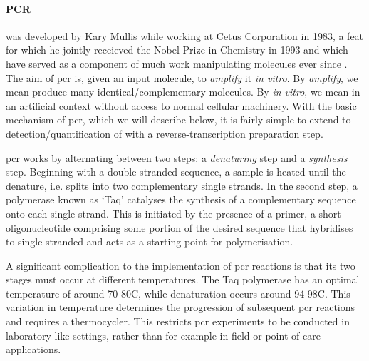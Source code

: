 \documentclass[thesis.tex]{subfiles}
\begin{document}
\paragraph{PCR}
  was developed by Kary Mullis while working at Cetus Corporation in 1983, a feat for which he jointly receieved the Nobel Prize in Chemistry in 1993 and which have served as a component of much work manipulating  molecules ever since \citep{saiki_enzymatic_1985, mullis_specific_1986}. The aim of \gls{pcr} is, given an input  molecule, to \emph{amplify} it \emph{in vitro}. By \emph{amplify}, we mean produce many identical/complementary  molecules. By \emph{in vitro}, we mean in an artificial context without access to normal cellular machinery. With the basic mechanism of \gls{pcr}, which we will describe below, it is fairly simple to extend to detection/quantification of  with a reverse-transcription preparation step.

\Gls{pcr} works by alternating between two steps: a \emph{denaturing} step and a \emph{synthesis} step. Beginning with a double-stranded  sequence, a sample is heated until the  denature, i.e. splits into two complementary single strands. In the second step, a polymerase known as `Taq' catalyses the synthesis of a complementary sequence onto each single strand. This is initiated by the presence of a primer, a short oligonucleotide comprising some portion of the desired sequence that hybridises to single stranded  and acts as a starting point for polymerisation. 

A significant complication to the implementation of \gls{pcr} reactions is that its two stages must occur at different temperatures. The Taq polymerase has an optimal temperature of around 70-80\nolinebreak\textdegree\nolinebreak C, while denaturation occurs around 94-98\nolinebreak\textdegree\nolinebreak C. This variation in temperature determines the progression of subsequent \gls{pcr} reactions and requires a thermocycler. This restricts \gls{pcr} experiments to be conducted in laboratory-like settings, rather than for example in field or point-of-care applications.
\end{document}
